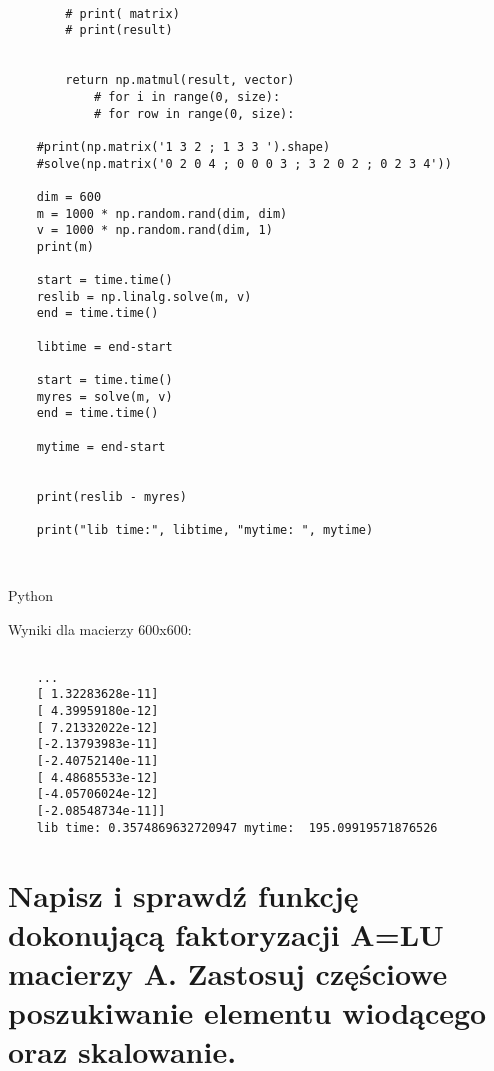 \begin{verbatim}
        
        # print( matrix)
        # print(result)
    
        
        return np.matmul(result, vector)
            # for i in range(0, size):
            # for row in range(0, size):
    
    #print(np.matrix('1 3 2 ; 1 3 3 ').shape)
    #solve(np.matrix('0 2 0 4 ; 0 0 0 3 ; 3 2 0 2 ; 0 2 3 4'))
    
    dim = 600
    m = 1000 * np.random.rand(dim, dim)
    v = 1000 * np.random.rand(dim, 1)
    print(m)
    
    start = time.time()
    reslib = np.linalg.solve(m, v)
    end = time.time()
    
    libtime = end-start
    
    start = time.time()
    myres = solve(m, v)
    end = time.time()
    
    mytime = end-start
    
    
    print(reslib - myres)
    
    print("lib time:", libtime, "mytime: ", mytime)
    
    

\end{verbatim}{Python}


Wyniki dla macierzy 600x600:

\begin{lstlisting}

	...
	[ 1.32283628e-11]
	[ 4.39959180e-12]
	[ 7.21332022e-12]
	[-2.13793983e-11]
	[-2.40752140e-11]
	[ 4.48685533e-12]
	[-4.05706024e-12]
	[-2.08548734e-11]]
	lib time: 0.3574869632720947 mytime:  195.09919571876526
\end{lstlisting}


\section{Napisz i sprawdź funkcję dokonującą faktoryzacji A=LU macierzy A. Zastosuj częściowe poszukiwanie elementu wiodącego oraz skalowanie.}

